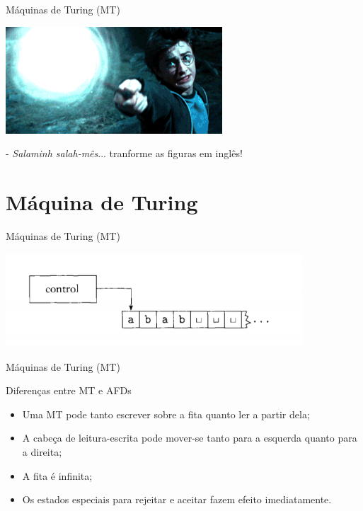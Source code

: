 \documentclass[xcolor=dvipsnames,table]{beamer}
\begin{document}
	\begin{frame}{Máquinas de Turing (MT)}
		\begin{center}
			\includegraphics[height=4cm]{images/harry.png}
			
			- {\it Salaminh salah-mês}... tranforme as figuras em inglês!
		\end{center}
	\end{frame}	
	
	\section{Máquina de Turing}
	\begin{frame}{Máquinas de Turing (MT)}
		\begin{center}
			\includegraphics[height=3.5cm]{images/fig31.png}
		\end{center}
	\end{frame}
	
	\begin{frame}{Máquinas de Turing (MT)}
		\begin{block}{Diferenças entre MT e AFDs}
			\begin{itemize}
				\item Uma MT pode tanto escrever sobre a fita quanto ler a partir dela; \pause
				\item A cabeça de leitura-escrita pode mover-se tanto para a esquerda quanto para a direita; \pause
				\item A fita é infinita; \pause
				\item Os estados especiais para rejeitar e aceitar fazem efeito imediatamente.
			\end{itemize}
		\end{block}
	\end{frame}
	
\end{document}
